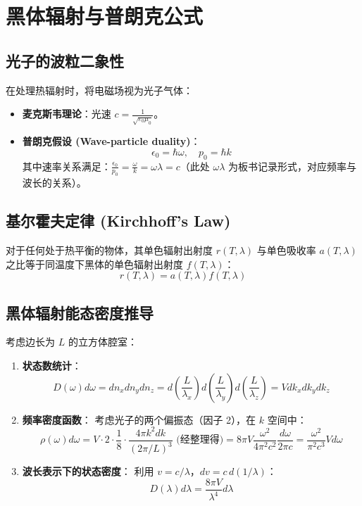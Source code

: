 \documentclass{article}
\begin{document}
\section{黑体辐射与普朗克公式}

\subsection{光子的波粒二象性}
在处理热辐射时，将电磁场视为光子气体：
\begin{itemize}
    \item \textbf{麦克斯韦理论}：光速 $c = \frac{1}{\sqrt{\varepsilon_0 \mu_0}}$。
    \item \textbf{普朗克假设 (Wave-particle duality)}：
    \[ \epsilon_0 = \hbar \omega, \quad p_0 = \hbar k \]
    其中速率关系满足：$\frac{\epsilon_0}{p_0} = \frac{\omega}{k} = \omega \lambda = c$（此处 $\omega \lambda$ 为板书记录形式，对应频率与波长的关系）。
\end{itemize}

\subsection{基尔霍夫定律 (Kirchhoff's Law)}
对于任何处于热平衡的物体，其单色辐射出射度 $r(T, \lambda)$ 与单色吸收率 $a(T, \lambda)$ 之比等于同温度下黑体的单色辐射出射度 $f(T, \lambda)$：
\[ r(T, \lambda) = a(T, \lambda) f(T, \lambda) \]

\subsection{黑体辐射能态密度推导}
考虑边长为 $L$ 的立方体腔室：
\begin{enumerate}
    \item \textbf{状态数统计}：
    \[ D(\omega) d\omega = dn_x dn_y dn_z = d\left(\frac{L}{\lambda_x}\right) d\left(\frac{L}{\lambda_y}\right) d\left(\frac{L}{\lambda_z}\right) = V dk_x dk_y dk_z \]
    \item \textbf{频率密度函数}：
    考虑光子的两个偏振态（因子 2），在 $k$ 空间中：
    \[ \rho(\omega) d\omega = V \cdot 2 \cdot \frac{1}{8} \cdot \frac{4\pi k^2 dk}{(2\pi/L)^3} \text{ (经整理得)} = 8\pi V \frac{\omega^2}{4\pi^2 c^2} \frac{d\omega}{2\pi c} = \frac{\omega^2}{\pi^2 c^3} V d\omega \]
    \item \textbf{波长表示下的状态密度}：
    利用 $v = c/\lambda$，$dv = c \, d(1/\lambda)$：
    \[ D(\lambda) d\lambda = \frac{8\pi V}{\lambda^4} d\lambda \]
\end{enumerate}
\end{document}
